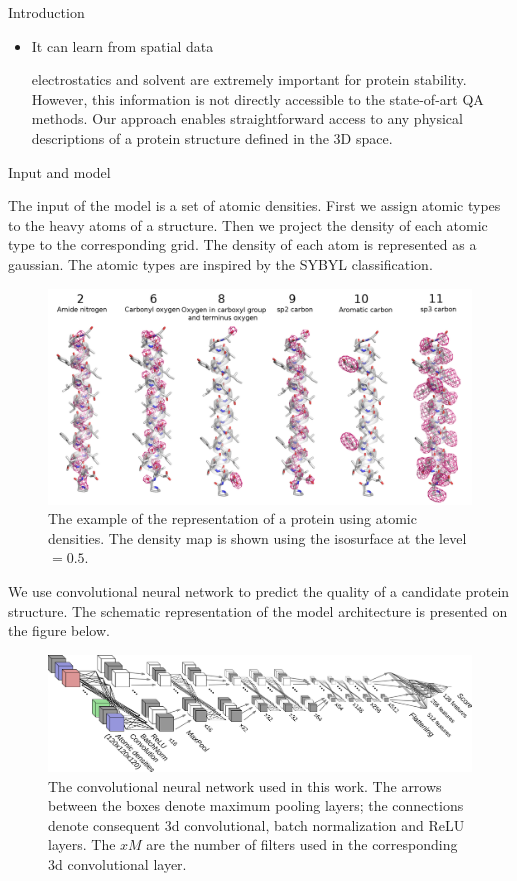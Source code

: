 \documentclass[final, unknownkeysallowed]{beamer}
\begin{document}
\begin{frame}{}
\begin{textblock}{39.0}
\begin{block}{Introduction}
\begin{itemize}
\item It can learn from spatial data

electrostatics and solvent are extremely important for protein stability. 
However, this information is not directly accessible to the state-of-art QA methods.
Our approach enables straightforward access to any physical descriptions of a protein structure defined in the 3D space.
\end{itemize}
\end{block}

\begin{block}{Input and model}

The input of the model is a set of atomic densities. 
First we assign atomic types to the heavy atoms of a structure. 
Then we project the density of each atomic type to the corresponding grid. 
The density of each atom is represented as a gaussian. 
The atomic types are inspired by the SYBYL classification.

\begin{figure}[H]
    \centering
    \includegraphics[width=0.7\linewidth]{../draft/Fig/atomic_densities_V3.png}
    \caption{The example of the representation of a protein using atomic densities. The density map is 
    shown using the isosurface at the level $ = 0.5$.}
    \label{Fig:atomic_densities}
\end{figure}

We use convolutional neural network to predict the quality of a candidate protein structure. 
The schematic representation of the model architecture is presented on the figure below.

\begin{figure}[H]
    \centering
    \includegraphics[width=\linewidth]{../draft/Fig/ConvnetDiagramV1.png}
    \caption{The convolutional neural network used in this work. 
    The arrows between the boxes denote maximum pooling layers; the connections denote 
    consequent 3d convolutional, batch normalization and ReLU layers. The $xM$ are the number of filters 
    used in the corresponding 3d convolutional layer.}
    \label{Fig:CNNModel}
\end{figure}


\end{block}
\end{textblock}
\end{frame}
\end{document}
